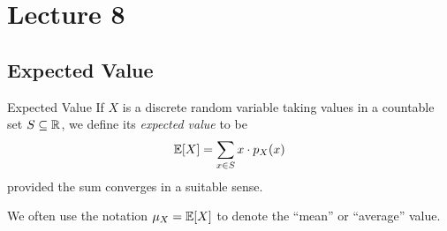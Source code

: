 \documentclass[class=article, crop=false]{standalone}
\begin{document}
  \section{Lecture 8}
  \subsection{Expected Value}
  \begin{definition}{Expected Value}
    If $X$ is a discrete random variable taking values in a countable set $S\subseteq\mathbb{R}$, we define its \emph{expected value} to be
    \[
      \mathbb{E}[X] = \sum_{x\in S}x\cdot p_X(x)
    \]
    provided the sum converges in a suitable sense.
  \end{definition}
  \begin{note}{}
    We often use the notation $\mu_X = \mathbb{E}[X]$ to denote the ``mean'' or ``average'' value.
  \end{note}
\end{document}
